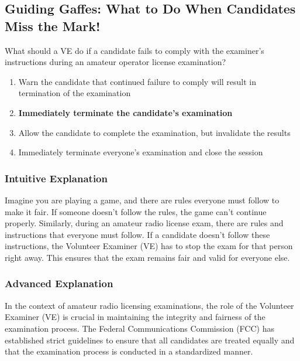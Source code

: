 \subsection{Guiding Gaffes: What to Do When Candidates Miss the Mark!}

\begin{tcolorbox}[colback=gray!10!white,colframe=black!75!black,title=E1E07] What should a VE do if a candidate fails to comply with the examiner’s instructions during an amateur operator license examination?
    \begin{enumerate}[label=\Alph*,noitemsep]
        \item Warn the candidate that continued failure to comply will result in termination of the examination
        \item \textbf{Immediately terminate the candidate’s examination}
        \item Allow the candidate to complete the examination, but invalidate the results
        \item Immediately terminate everyone’s examination and close the session
    \end{enumerate}
\end{tcolorbox}

\subsubsection{Intuitive Explanation}
Imagine you are playing a game, and there are rules everyone must follow to make it fair. If someone doesn’t follow the rules, the game can’t continue properly. Similarly, during an amateur radio license exam, there are rules and instructions that everyone must follow. If a candidate doesn’t follow these instructions, the Volunteer Examiner (VE) has to stop the exam for that person right away. This ensures that the exam remains fair and valid for everyone else.

\subsubsection{Advanced Explanation}
In the context of amateur radio licensing examinations, the role of the Volunteer Examiner (VE) is crucial in maintaining the integrity and fairness of the examination process. The Federal Communications Commission (FCC) has established strict guidelines to ensure that all candidates are treated equally and that the examination process is conducted in a standardized manner.

